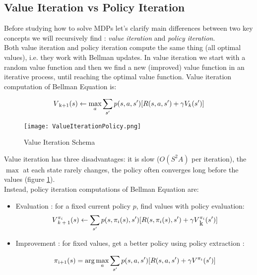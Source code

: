 \subsection{Value Iteration vs Policy Iteration} Before studying how to solve MDPs let's clarify main differences between two key concepts we will recursively find : \textit{value iteration} and \textit{policy iteration}. \\

Both value iteration and policy iteration compute the same thing (all optimal values), i.e. they work with Bellman updates. In value iteration we start with a random value function and then we find a new (improved) value function in an iterative process, until reaching the optimal value function. Value iteration computation of Bellman Equation is:

\begin{equation}
	V\textsubscript{k+1}(s) \leftarrow \max_{a} \sum_{s'} p(s, a, s') [R(s, a, s') + \gamma V_k(s')]
\end{equation}

\begin{figure}[h!]
	\centering
	\texttt{[image: ValueIterationPolicy.png]}
	\caption{Value Iteration Schema}
	\label{fig:ValueiterationPolicy}
\end{figure}

Value iteration has three disadvantages: it is slow ($O(S^2A)$ per iteration), the $\max$ at each state rarely changes, the policy often converges long before the values (figure \ref{fig:ValueiterationPolicy}). \\

Instead, policy iteration computations of Bellman Equation are:

\begin{itemize}
	\item Evaluation : for a fixed current policy $p$, find values with policy evaluation:
		\begin{equation}
			V\textsupsub{$\pi_i$}{$k+1$}(s) \leftarrow \sum_{s'}p(s, \pi_i(s), s')[R(s, \pi_i(s), s') + \gamma V\textsupsub{$\pi_i$}{k}(s')]
		\end{equation}
	
	\item Improvement : for fixed values, get a better policy using policy extraction :
	
	\begin{equation}
		\pi\textsubscript{i+1}(s) = \arg \max_{a} \sum_{s'} p(s, a, s')[R(s, a, s') + \gamma V\textsuperscript{$\pi_i$}(s')]
	\end{equation}
\end{itemize}


